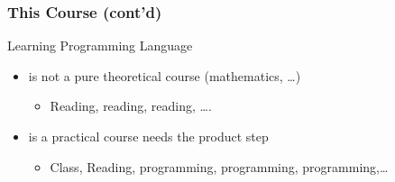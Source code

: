 \documentclass{../c-lecture}
\begin{document}
\begin{frame}
  \frametitle{This Course (cont'd)}
  Learning Programming Language

  \begin{itemize}
    \item is not a pure theoretical course (mathematics, …)
    \begin{itemize}
      \item Reading, reading, reading, ….
    \end{itemize}
    \item is a practical course needs the product step
    \begin{itemize}
      \item Class, Reading, programming, programming, programming,…
    \end{itemize}
  \end{itemize}
\end{frame}
\end{document}
